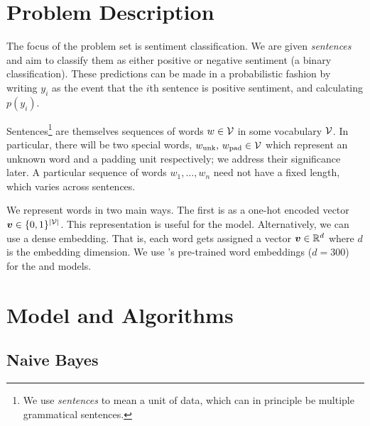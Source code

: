 \documentclass[11pt]{article}
\begin{document}



\section{Problem Description}

The focus of the problem set is sentiment classification. We are given
\emph{sentences} and aim to classify them as either positive or negative
sentiment (a binary classification). These predictions can be made in a
probabilistic fashion by writing $y_i$ as the event that the $i$th sentence is
positive sentiment, and calculating $p(y_i)$.

Sentences\footnote{We use \emph{sentences} to mean a unit of data, which can in
principle be multiple grammatical sentences.} are themselves sequences of words
$w \in \mathcal{V}$ in some vocabulary
$\mathcal{V}$. In particular, there will be two special words, $w_\text{unk},\,
w_\text{pad} \in \mathcal{V}$ which represent an unknown word and a padding unit
respectively; we address their significance later. A particular sequence of
words $w_1, \ldots, w_n$ need not have a fixed length, which varies
across sentences. 

We represent words in two main ways. The first is as a one-hot encoded vector
$\boldsymbol{v} \in \{0,1\}^{|\mathcal{V}|}$. This representation is useful for the
 model. Alternatively, we can use a dense embedding.
That is, each word gets assigned a vector $\boldsymbol{v} \in \mathbb{R}^d$ where $d$ is
the embedding dimension. We use \citet{mikolov2013efficient}'s pre-trained word
embeddings ($d=300$) for the  and 
models.


\section{Model and Algorithms}
\label{sec:models}

\subsection{Naive Bayes}
\label{subsec:nb}
\end{document}
